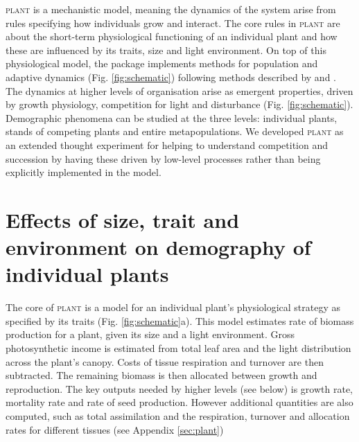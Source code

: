 \documentclass[a4paper,11pt]{article}
\newcommand{\plant}{\textsc{plant}}
\begin{document}
{\plant} is a mechanistic model, meaning the dynamics of the system
arise from rules specifying how individuals grow and interact.  The
core rules in {\plant} are about the short-term physiological
functioning of an individual plant and how these are influenced by its
traits, size and light environment.
%
On top of this physiological model, the package implements methods for
population and adaptive dynamics (Fig.  \ref{fig:schematic}) following
methods described by \citet{Falster-2011} and
\citet{Falster-2015}. 
%
The dynamics at higher levels of organisation arise as emergent
properties, driven by growth physiology, competition for light and
disturbance (Fig.  \ref{fig:schematic}). Demographic phenomena can be
studied at the three levels: individual plants, stands of competing
plants and entire metapopulations.
%
We developed {\plant} as an extended thought experiment for helping to
understand competition and succession by having these driven by
low-level processes rather than being explicitly implemented in the
model.
%
%
%

\section{Effects of size, trait and environment on demography of individual plants}

The core of {\plant} is a model for an individual plant's
physiological strategy as specified by its traits
(Fig. \ref{fig:schematic}a). This model estimates rate of biomass
production for a plant, given its size and a light environment. Gross
photosynthetic income is estimated from total leaf area and the light
distribution across the plant's canopy. Costs of tissue respiration
and turnover are then subtracted. The remaining biomass is then
allocated between growth and reproduction.  
%
The key outputs needed by higher levels (see below) is growth rate,
mortality rate and rate of seed production.  However additional
quantities are also computed, such as total assimilation and the
respiration, turnover and allocation rates for different tissues (see
Appendix \ref{sec:plant})
\end{document}
